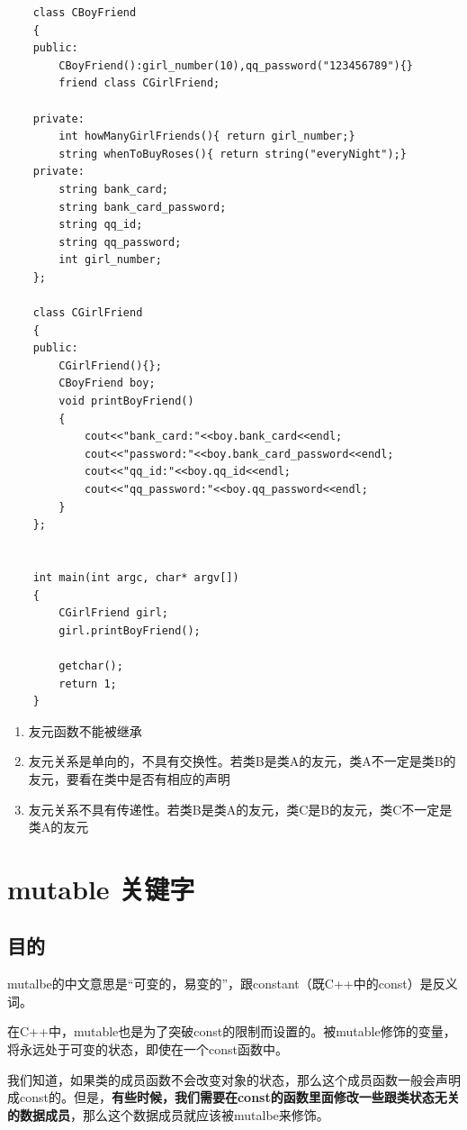 \documentclass[UTF8,a4paper,12pt]{ctexbook} %
\begin{document}
		     \begin{lstlisting}
	class CBoyFriend
	{
	public:
		CBoyFriend():girl_number(10),qq_password("123456789"){}
		friend class CGirlFriend;
	
	private:
		int howManyGirlFriends(){ return girl_number;}	
		string whenToBuyRoses(){ return string("everyNight");}
	private:
		string bank_card;
		string bank_card_password;
		string qq_id;
		string qq_password;	
		int girl_number;
	};
	
	class CGirlFriend
	{
	public:
		CGirlFriend(){};
		CBoyFriend boy;
		void printBoyFriend()
		{
			cout<<"bank_card:"<<boy.bank_card<<endl;
			cout<<"password:"<<boy.bank_card_password<<endl;
			cout<<"qq_id:"<<boy.qq_id<<endl;
			cout<<"qq_password:"<<boy.qq_password<<endl;
		}
	};
	
	
	int main(int argc, char* argv[])
	{	
		CGirlFriend girl;	
		girl.printBoyFriend();
		
		getchar();
		return 1;
	}		     
		    \end{lstlisting}
		    
		    \begin{enumerate}[fullwidth,itemindent = 2em,label=(\arabic*)]
		    	\item 友元函数不能被继承
		    	\item 友元关系是单向的，不具有交换性。若类B是类A的友元，类A不一定是类B的友元，要看在类中是否有相应的声明
		    	\item 友元关系不具有传递性。若类B是类A的友元，类C是B的友元，类C不一定是类A的友元
		    \end{enumerate}
		    
		    
		    
\chapter{mutable 关键字}
\section{目的}
	mutalbe的中文意思是“可变的，易变的”，跟constant（既C++中的const）是反义词。
	
	在C++中，mutable也是为了突破const的限制而设置的。被mutable修饰的变量，将永远处于可变的状态，即使在一个const函数中。
	
	我们知道，如果类的成员函数不会改变对象的状态，那么这个成员函数一般会声明成const的。但是，\textbf{有些时候，我们需要在const的函数里面修改一些跟类状态无关的数据成员}，那么这个数据成员就应该被mutalbe来修饰。
\end{document}
